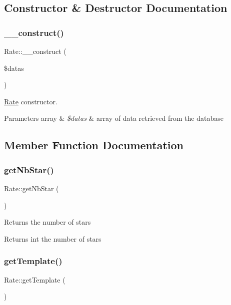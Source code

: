 \subsection{Constructor \& Destructor Documentation}
\mbox{\label{classRate_a9c1d1659c4ea618cb6c7bcfa627511c2}} 
\subsubsection{\texorpdfstring{\+\_\+\+\_\+construct()}{\_\_construct()}}
{\footnotesize\ttfamily Rate\+::\+\_\+\+\_\+construct (\begin{DoxyParamCaption}\item[{}]{\$datas }\end{DoxyParamCaption})}

\hyperlink{classRate}{Rate} constructor. 
\begin{DoxyParams}[1]{Parameters}
array & {\em \$datas} & array of data retrieved from the database \\
\hline
\end{DoxyParams}


\subsection{Member Function Documentation}
\mbox{\label{classRate_a1259965577d0f575758f1a3de44c3d16}} 
\subsubsection{\texorpdfstring{get\+Nb\+Star()}{getNbStar()}}
{\footnotesize\ttfamily Rate\+::get\+Nb\+Star (\begin{DoxyParamCaption}{ }\end{DoxyParamCaption})}

Returns the number of stars \begin{DoxyReturn}{Returns}
int the number of stars 
\end{DoxyReturn}
\mbox{\label{classRate_a14e1c35dec3924b5b64bc9ac5b620011}} 
\subsubsection{\texorpdfstring{get\+Template()}{getTemplate()}}
{\footnotesize\ttfamily Rate\+::get\+Template (\begin{DoxyParamCaption}{ }\end{DoxyParamCaption})}

